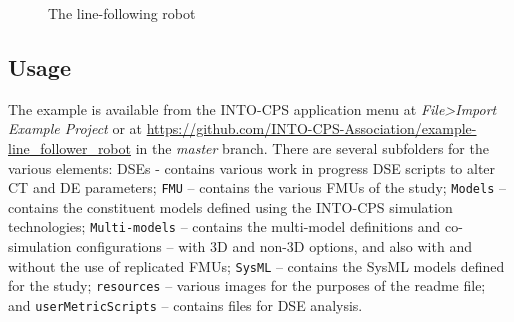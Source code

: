 \begin{figure}[htb!]
\begin{center}
\caption{The line-following robot}
\label{fig:linefollowoverview}
\end{center}
\end{figure}

\subsection{Usage}
\label{sec:linefollower_usage}

The example is available from the INTO-CPS application menu at \emph{File>Import Example Project} or at  \url{https://github.com/INTO-CPS-Association/example-line_follower_robot} in the \emph{master} branch. There are several subfolders for the various elements: DSEs - contains various work in progress DSE scripts to alter CT and DE parameters; \texttt{FMU} -- contains the various FMUs of the study; \texttt{Models} -- contains the constituent models defined using the INTO-CPS simulation technologies; \texttt{Multi-models} -- contains the multi-model definitions and co-simulation configurations -- with 3D and non-3D options, and also with and without the use of replicated FMUs; \texttt{SysML} -- contains the SysML models defined for the study; \texttt{resources} -- various images for the purposes of the readme file; and \texttt{userMetricScripts} -- contains files for DSE analysis. 

